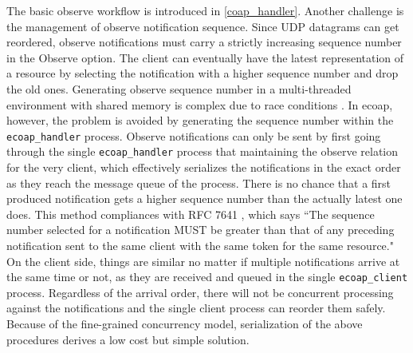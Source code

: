 The basic observe workflow is introduced in \autoref{coap_handler}. Another challenge is the management of observe notification sequence. Since UDP datagrams can get reordered, observe notifications must carry a strictly increasing sequence number in the Observe option. The client can eventually have the latest representation of a resource by selecting the notification with a higher sequence number and drop the old ones. Generating observe sequence number in a multi-threaded environment with shared memory is complex due to race conditions \autocite{kovatsch2015scalable}. In ecoap, however, the problem is avoided by generating the sequence number within the \verb|ecoap_handler| process. Observe notifications can only be sent by first going through the single \verb|ecoap_handler| process that maintaining the observe relation for the very client, which effectively serializes the notifications in the exact order as they reach the message queue of the process. There is no chance that a first produced notification gets a higher sequence number than the actually latest one does. This method compliances with RFC 7641 \autocite{coap_observe}, which says ``The sequence number selected for a notification MUST be greater than that of any preceding notification sent to the same client with the same token for the same resource." On the client side, things are similar no matter if multiple notifications arrive at the same time or not, as they are received and queued in the single \verb|ecoap_client| process. Regardless of the arrival order, there will not be concurrent processing against the notifications and the single client process can reorder them safely. Because of the fine-grained concurrency model, serialization of the above procedures derives a low cost but simple solution. 







